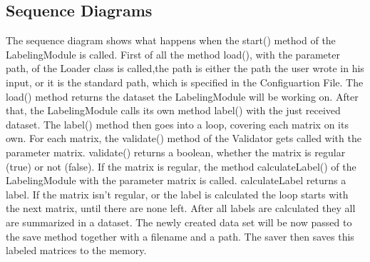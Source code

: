 \documentclass[parskip=full]{scrartcl}
\begin{document}
\subsection{Sequence Diagrams}
The sequence diagram shows what happens when the start() method of the LabelingModule is called.
First of all the method load(), with the parameter path, of the Loader class is called,the path is either the path the user wrote in his input, or it is the standard path, which is specified in the Configuartion File.
The load() method returns the dataset the LabelingModule will be working on.
After that, the LabelingModule calls its own method label() with the just received dataset.
The label() method then goes into a loop, covering each matrix on its own.
For each matrix, the validate() method of the Validator gets called with the parameter matrix. validate() returns a boolean, whether the matrix is regular (true) or not (false).
If the matrix is regular, the method calculateLabel() of the LabelingModule with the parameter matrix is called. calculateLabel returns a \gls{label}.
If the matrix isn't regular, or the \gls{label} is calculated the loop starts with the next matrix, until there are none left.
After all \glspl{label} are calculated they all are summarized in a dataset.
The newly created data set will be now passed to the save method together with a filename and a path.
The saver then saves this labeled matrices to the memory.

\newpage
\begin{figure}[h]
\begin{center}

\label{Activity Diagrams}
\end{center}
\end{figure}
\newpage
\end{document}
